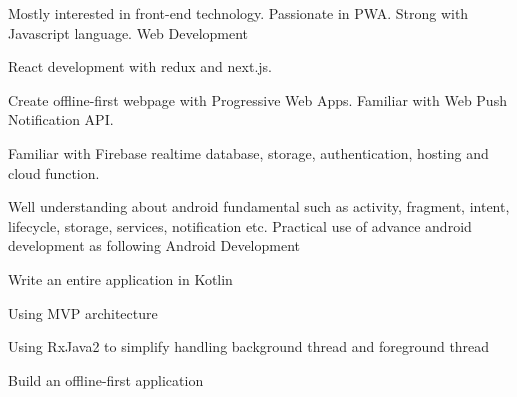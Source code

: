 

\begin{cventries}

  \cventry
    {Mostly interested in front-end technology. Passionate in PWA. Strong with Javascript language.} %
    {Web Development} %
    {} %
    {} %
    {
      \begin{cvitems} %
        \item {React development with redux and next.js.}
        \item {Create offline-first webpage with Progressive Web Apps. Familiar with Web Push Notification API.}
        \item {Familiar with Firebase realtime database, storage, authentication, hosting and cloud function.}
      \end{cvitems}
    }

  \cventry
    {Well understanding about android fundamental such as activity, fragment, intent, lifecycle, storage, services, notification etc. Practical use of advance android development as following} %
    {Android Development} %
    {} %
    {} %
    {
      \begin{cvitems} %
        \item {Write an entire application in Kotlin}
        \item {Using MVP architecture}
        \item {Using RxJava2 to simplify handling background thread and foreground thread}
        \item {Build an offline-first application}
      \end{cvitems}
    }

\end{cventries}
